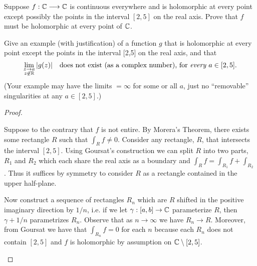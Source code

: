 \documentclass[10pt]{amsart}
\begin{document}
\begin{thm}
  \label{Ex1}
  \begin{alphaenum}
  \item
    Suppose $f: \mathbb{C} \longrightarrow \mathbb{C}$ is continuous everywhere and is holomorphic at every point except possibly the points in the interval $[2,5]$ on the real axis.  
    Prove that $f$ must be holomorphic at every point of $\mathbb{C}$.
    \item
      Give an example (with justification) of a function $g$ that is holomorphic
      at every point except the points in the interval [2,5] on the real axis,
      and that 
      $$
      \lim_{\substack{z \rightarrow a\\ z \not\in \mathbb{R}}} |g(z)|
      \quad \text{does not exist (as a complex number), for \it every } a \in [2,5].
      $$
      (Your example may have the limits $= \infty$ for some or all $a$, just no ``removable'' singularities
      at any $a \in [2,5]$.)
  \end{alphaenum}
  \begin{proof}
    \begin{alphaenum}
    \item
      Suppose to the contrary that $f$ is not entire.  
      By Morera's Theorem, there exists some rectangle $R$ such that $\int_R f \not = 0$.
      Consider any rectangle, $R$, that intersects the interval $[2,5]$.
      Using Goursat's construction we can split $R$ into two parts, $R_1$ and $R_2$ which each share the real axis as a boundary and $\int_R f = \int_{R_1} f + \int_{R_2}$.
      Thus it suffices by symmetry to consider $R$ as a rectangle contained in the upper half-plane.

      
      Now construct a sequence of rectangles $R_n$ which are $R$ shifted in the positive imaginary direction by $1/n$, i.e. if we let $\gamma:[a,b]\rightarrow \mathbb{C}$ parameterize $R$, then $\gamma + 1/n$ parametrizes $R_n$.
      Observe that as $n \rightarrow \infty$ we have $R_n \rightarrow R$.
      Moreover, from Goursat we have that $\int_{R_n} f = 0$ for each $n$ because each $R_n$ does not contain $[2,5]$ and $f$ is holomorphic by assumption on $\mathbb{C}\setminus[2,5]$.
      

\end{alphaenum}
\end{proof}
\end{thm}
\end{document}
